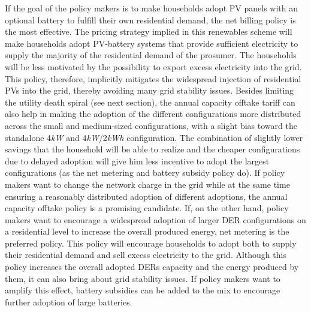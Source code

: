 \newline \newline \noindent
If the goal of the policy makers is to make households adopt PV panels with an optional battery to fulfill their own residential demand, the net billing policy is the most effective. The pricing strategy implied in this renewables scheme will make households adopt PV-battery systems that provide sufficient electricity to supply the majority of the residential demand of the prosumer. The households will be less motivated by the possibility to export excess electricity into the grid. This policy, therefore, implicitly mitigates the widespread injection of residential PVs into the grid, thereby avoiding many grid stability issues.
\newline \newline \noindent
Besides limiting the utility death spiral (see next section), the annual capacity offtake tariff can also help in making the adoption of the different configurations more distributed across the small and medium-sized configurations, with a slight bias toward the standalone 4\textit{kW} and 4\textit{kW}/2\textit{kWh} configuration. The combination of slightly lower savings that the household will be able to realize and the cheaper configurations due to delayed adoption will give him less incentive to adopt the largest configurations (as the net metering and battery subsidy policy do). If policy makers want to change the network charge in the grid while at the same time ensuring a reasonably distributed adoption of different adoptions, the annual capacity offtake policy is a promising candidate. 
\newline \newline \noindent
If, on the other hand, policy makers want to encourage a widespread adoption of larger DER configurations on a residential level to increase the overall produced energy, net metering is the preferred policy. This policy will encourage households to adopt both to supply their residential demand and sell excess electricity to the grid. Although this policy increases the overall adopted DERs capacity and the energy produced by them, it can also bring about grid stability issues. If policy makers want to amplify this effect, battery subsidies can be added to the mix to encourage further adoption of large batteries. 

